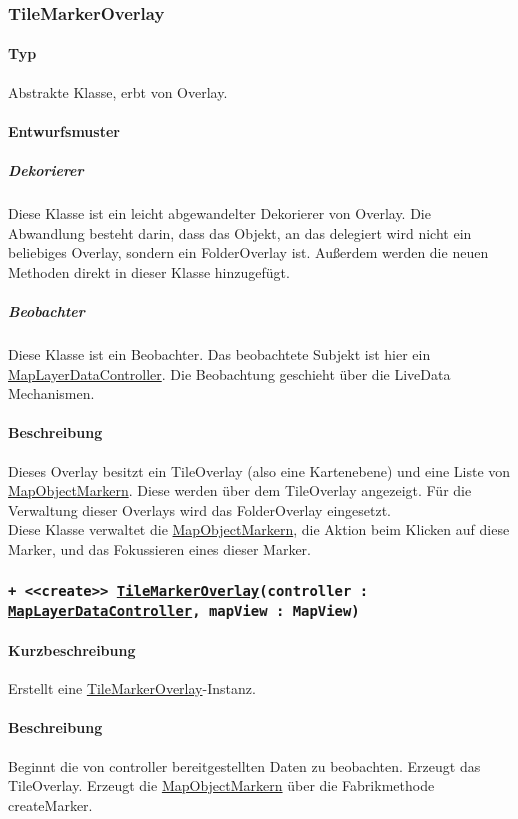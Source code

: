 \subsubsection{TileMarkerOverlay}\label{App_Map_View_TileMarkerOverlay}
\paragraph*{Typ} 
Abstrakte Klasse, erbt von Overlay.
\paragraph*{Entwurfsmuster}
\subparagraph*{Dekorierer}
Diese Klasse ist ein leicht abgewandelter Dekorierer von Overlay.
Die Abwandlung besteht darin, dass das Objekt, an das delegiert wird nicht ein
beliebiges Overlay, sondern ein FolderOverlay ist. Außerdem werden die neuen 
Methoden direkt in dieser Klasse hinzugefügt.\\
\subparagraph*{Beobachter}
Diese Klasse ist ein Beobachter. Das beobachtete Subjekt ist hier ein \hyperref[App_Map_ViewModel_MapLayerDataController]{MapLayerDataController}.
Die Beobachtung geschieht über die LiveData Mechanismen.
\paragraph*{Beschreibung}
Dieses Overlay besitzt ein TileOverlay (also eine Kartenebene) und eine 
Liste von \hyperref[App_Map_View_MapObjectMarker]{MapObjectMarkern}. Diese werden über dem TileOverlay angezeigt.
Für die Verwaltung dieser Overlays wird das FolderOverlay eingesetzt.\\
Diese Klasse verwaltet die \hyperref[App_Map_View_MapObjectMarker]{MapObjectMarkern}, die Aktion beim Klicken auf diese Marker, 
und das Fokussieren eines dieser Marker.

\subsubsection*{\texttt{+ <<create>> \hyperref[App_Map_View_TileMarkerOverlay]{TileMarkerOverlay}(controller : \hyperref[App_Map_ViewModel_MapLayerDataController]{MapLayerDataController}, mapView : MapView)}}%
\paragraph*{Kurzbeschreibung}
Erstellt eine \hyperref[App_Map_View_TileMarkerOverlay]{TileMarkerOverlay}-Instanz.
\paragraph*{Beschreibung}
Beginnt die von controller bereitgestellten Daten zu beobachten. Erzeugt das TileOverlay.
Erzeugt die \hyperref[App_Map_View_MapObjectMarker]{MapObjectMarkern} über die Fabrikmethode createMarker.
